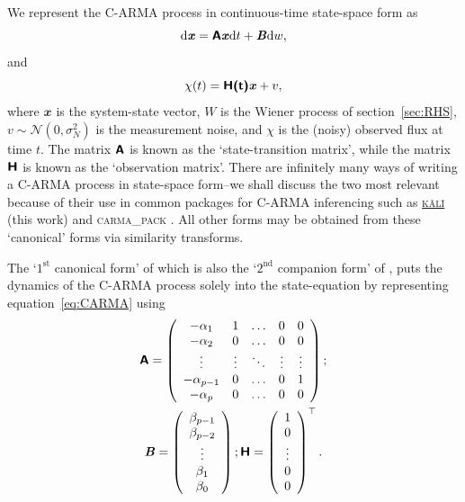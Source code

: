 \documentclass[a4paper,fleqn,usenatbib]{mnras}
\begin{document}
We represent the C-ARMA process in continuous-time state-space form \citep{Wiberg,Friedland} as
\begin{equation}\label{eq:StateEqn}
\mathrm{d}\textbf{\textit{x}} = \textbf{\textsf{A}}\textbf{\textit{x}}\mathrm{d}t + \textbf{\textit{B}}\mathrm{d}w,
\end{equation}
and
\begin{equation}\label{eq:ObsEqn}
\chi(t) = \textbf{\textsf{H(t)}}\textbf{\textit{x}} + v,
\end{equation}
where $\mathbfit{x}$ is the system-state vector, $W$ is the Wiener process of section~\ref{sec:RHS}, $v \sim \mathcal{N}(0,\sigma^{2}_{N})$ is the measurement noise, and $\chi$ is the (noisy) observed flux at time $t$. The matrix $\textbf{\textsf{A}}$ is known as the `state-transition matrix', while the matrix $\textbf{\textsf{H}}$ is known as the `observation matrix'. There are infinitely many ways of writing a C-ARMA process in state-space form--we shall discuss the two most relevant \citep{Denham74,Kailath74} because of their use in common packages for C-ARMA inferencing such as \href{https://github.com/AstroVPK/kali}{\textsc{k\={a}l\={i}}} (this work) and \textsc{carma\_pack} \citep{Kelly14}. All other forms may be obtained from these `canonical' forms via similarity transforms.

The `$1^{\mathrm{st}}$ canonical form' of \citet{Wiberg} which is also the `$2^{\mathrm{nd}}$ companion form' of \citet{Friedland}, puts the dynamics of the C-ARMA process solely into the state-equation by representing equation~\eqref{eq:CARMA} using
\begin{multline}\label{eq:1stCanForm}
\textbf{\textsf{A}} = \left( \begin{array}{ccccc}
-\alpha_{1} & 1 & \hdots & 0 & 0 \\
-\alpha_{2} & 0 & \hdots & 0 & 0 \\
\vdots & \vdots & \ddots & \vdots & \vdots \\
-\alpha_{p-1} & 0 & \hdots & 0 & 1 \\
-\alpha_{p} & 0 & \hdots & 0 & 0 \\
\end{array}\right); \\ \textbf{\textit{B}} = \left( \begin{array}{c} \beta_{p-1} \\ \beta_{p-2} \\ \vdots \\ \beta_{1} \\ \beta_{0} \end{array} \right); \textbf{\textsf{H}} = \left( \begin{array}{c} 1 \\ 0 \\ \vdots \\ 0 \\ 0 \end{array} \right)^{\top}.
\end{multline}
\end{document}
